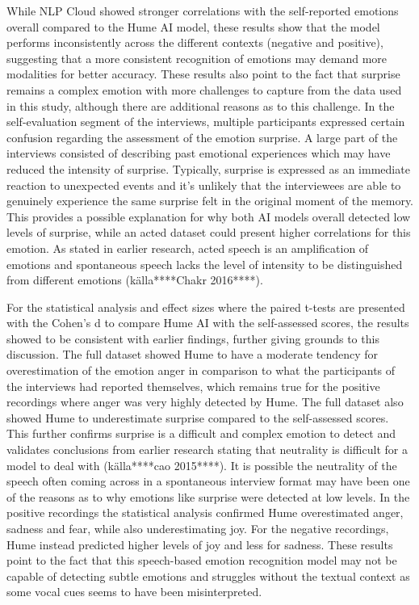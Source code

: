While NLP Cloud showed stronger correlations with the self-reported emotions overall compared to the Hume AI model, these results show that the model performs inconsistently across the different contexts (negative and positive), suggesting that a more consistent recognition of emotions may demand more modalities for better accuracy. These results also point to the fact that surprise remains a complex emotion with more challenges to capture from the data used in this study, although there are additional reasons as to this challenge. In the self-evaluation segment of the interviews, multiple participants expressed certain confusion regarding the assessment of the emotion surprise. A large part of the interviews consisted of describing past emotional experiences which may have reduced the intensity of surprise. Typically, surprise is expressed as an immediate reaction to unexpected events and it’s unlikely that the interviewees are able to genuinely experience the same surprise felt in the original moment of the memory. This provides a possible explanation for why both AI models overall detected low levels of surprise, while an acted dataset could present higher correlations for this emotion. As stated in earlier research, acted speech is an amplification of emotions and spontaneous speech lacks the level of intensity to be distinguished from different emotions (källa****Chakr 2016****).

For the statistical analysis and effect sizes where the paired t-tests are presented with the Cohen’s d to compare Hume AI with the self-assessed scores, the results showed to be consistent with earlier findings, further giving grounds to this discussion. 
The full dataset showed Hume to have a moderate tendency for overestimation of the emotion anger in comparison to what the participants of the interviews had reported themselves, which remains true for the positive recordings where anger was very highly detected by Hume. The full dataset also showed Hume to underestimate surprise compared to the self-assessed scores. This further confirms surprise is a difficult and complex emotion to detect and validates conclusions from earlier research stating that neutrality is difficult for a model to deal with (källa****cao 2015****). It is possible the neutrality of the speech often coming across in a spontaneous interview format may have been one of the reasons as to why emotions like surprise were detected at low levels.
In the positive recordings the statistical analysis confirmed Hume overestimated anger, sadness and fear, while also underestimating joy. 
For the negative recordings, Hume instead predicted higher levels of joy and less for sadness. These results point to the fact that this speech-based emotion recognition model may not be capable of detecting subtle emotions and struggles without the textual context as some vocal cues seems to have been misinterpreted.

